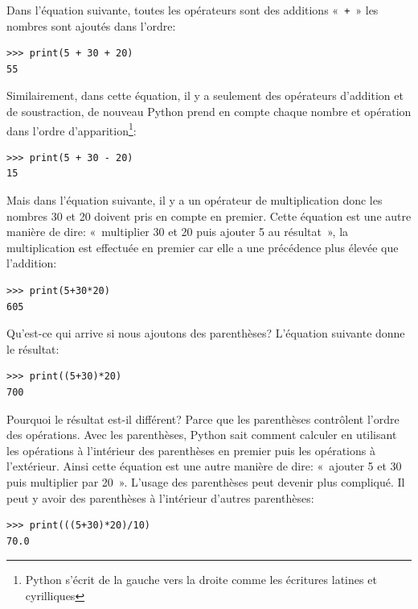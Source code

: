 Dans l'équation suivante, toutes les opérateurs sont des additions «~\texttt{+}~» les nombres sont ajoutés dans l'ordre:

\begin{Verbatim}[frame=single,rulecolor=\color{mbleu}, label=à taper]
>>> print(5 + 30 + 20)
55
\end{Verbatim}


Similairement, dans cette équation, il y a seulement des opérateurs d'addition et de soustraction, de nouveau Python prend en compte chaque nombre et opération dans l'ordre d'ap\-pa\-ri\-tion\footnote{Python s'écrit de la gauche vers la droite comme les écritures latines et cyrilliques}:

\begin{Verbatim}[frame=single,rulecolor=\color{mbleu}, label=à taper]
>>> print(5 + 30 - 20)
15
\end{Verbatim}
\rm

Mais dans l'équation suivante, il y a un opérateur de multiplication donc les nombres 30 et 20 doivent pris en compte en premier. Cette équation est une autre manière de dire: «~multiplier 30 et 20 puis ajouter 5 au résultat~», la multiplication est effectuée en premier car elle a une précédence plus élevée que l'addition:

\begin{Verbatim}[frame=single,rulecolor=\color{mbleu}, label=à taper]
>>> print(5+30*20)
605
\end{Verbatim}


Qu'est-ce qui arrive si nous ajoutons des parenthèses? L'équation suivante donne le résultat:

\begin{Verbatim}[frame=single,rulecolor=\color{mbleu}, label=à taper]
>>> print((5+30)*20)
700
\end{Verbatim}
\rm

Pourquoi le résultat est-il différent? Parce que les parenthèses contrôlent l'ordre des opérations. Avec les parenthèses, Python sait comment calculer en utilisant les opérations à l'intérieur des parenthèses en premier puis les opérations à l'extérieur.
Ainsi cette équation est une autre manière de dire: «~ajouter 5 et 30 puis multiplier par 20~». L'usage des parenthèses peut devenir plus compliqué. Il peut y avoir des parenthèses à l'intérieur d'autres parenthèses:

\begin{Verbatim}[frame=single,rulecolor=\color{mbleu}, label=à taper]
>>> print(((5+30)*20)/10)
70.0
\end{Verbatim}


